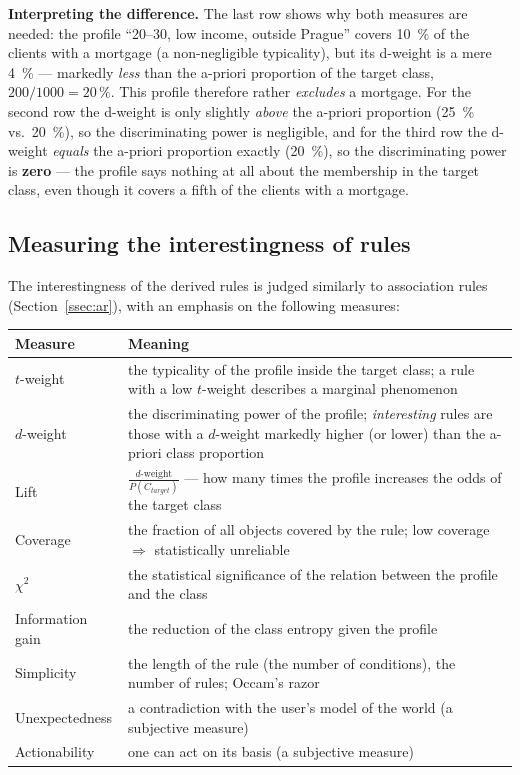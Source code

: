 \documentclass[11pt,a4paper]{article}
\theoremstyle{definition}
\providecommand{\uv}[1]{``#1''}
\begin{document}
\begin{defbox}
\textbf{Interpreting the difference.} The last row shows why both measures are needed: the profile
\uv{20--30, low income, outside Prague} covers 10~\% of the clients with a mortgage (a
non-negligible typicality), but its d-weight is a mere 4~\% --- markedly \emph{less} than the
a-priori proportion of the target class, $200/1000=20\,\%$. This profile therefore rather
\emph{excludes} a mortgage. For the second row the d-weight is only slightly \emph{above} the
a-priori proportion (25~\% vs.\ 20~\%), so the discriminating power is negligible, and for the
third row the d-weight \emph{equals} the a-priori proportion exactly (20~\%), so the discriminating
power is \textbf{zero} --- the profile says nothing at all about the membership in the target
class, even though it covers a fifth of the clients with a mortgage.
\end{defbox}

\subsection{Measuring the interestingness of rules}

The interestingness of the derived rules is judged similarly to association rules
(Section~\ref{ssec:ar}), with an emphasis on the following measures:

\begin{center}
\small
\begin{tabular}{@{}lp{11.0cm}@{}}
\toprule
\textbf{Measure} & \textbf{Meaning} \\
\midrule
$t$-weight & the typicality of the profile inside the target class; a rule with a low $t$-weight
  describes a marginal phenomenon \\
$d$-weight & the discriminating power of the profile; \emph{interesting} rules are those with a
  $d$-weight markedly higher (or lower) than the a-priori class proportion \\
Lift & $\frac{d\text{-weight}}{P(C_{target})}$ --- how many times the profile increases the odds
  of the target class \\
Coverage & the fraction of all objects covered by the rule; low coverage $\Rightarrow$
  statistically unreliable \\
$\chi^2$ & the statistical significance of the relation between the profile and the class \\
Information gain & the reduction of the class entropy given the profile \\
Simplicity & the length of the rule (the number of conditions), the number of rules; Occam's
  razor \\
Unexpectedness & a contradiction with the user's model of the world (a subjective measure) \\
Actionability & one can act on its basis (a subjective measure) \\
\bottomrule
\end{tabular}
\end{center}
\end{document}
